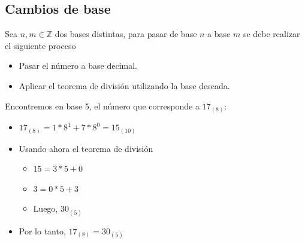 \documentclass[10pt,a4paper]{article}
\begin{document}
\subsection*{Cambios de base} 
Sea \( n, m \in \mathbb{Z} \) dos bases distintas, para pasar de base \(n\) a base \(m\) se debe realizar el siguiente proceso

\begin{itemize}
    \item Pasar el número a base decimal.
    \item Aplicar el teorema de división utilizando la base deseada.
\end{itemize}

Encontremos en base 5, el número que corresponde a \(17_{(8)}\):
\begin{itemize}
    \item  \( 17_{(8)} = 1 \ast 8^{1} + 7 \ast 8^{0} = 15_{(10)} \)
    \item Usando ahora el teorema de división
    \begin{itemize}
    \item  \( 15 = 3 \ast 5 + 0 \)
    \item  \( 3 = 0 \ast 5 + 3 \)
    \item Luego, \( 30_{(5)} \)
    \end{itemize} 
    \item Por lo tanto, \( 17_{(8)} = 30_{(5)} \)
\end{itemize} 
\end{document}
